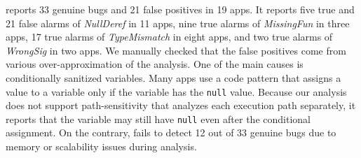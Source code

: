 \ours reports 33 genuine bugs and 21 false positives in 19 apps.
It reports five true and 21 false alarms of {\it NullDeref} in 11 apps,
nine true alarms of {\it MissingFun} in three apps,
17 true alarms of {\it TypeMismatch} in eight apps, and
two true alarms of {\it WrongSig} in two apps.
We manually checked that the false positives come from various over-approximation
of the analysis. One of the main causes is conditionally sanitized variables.  Many apps
use a code pattern that assigns a value to a variable only if the variable has
the {\tt null} value. Because our analysis does not support
path-sensitivity that analyzes each execution path separately, it reports that
the variable may still have {\tt null} even after the conditional assignment.
On the contrary, \lees fails to detect 12 out of 33 genuine bugs
due to memory or scalability issues during analysis.

